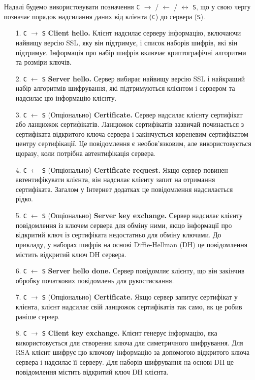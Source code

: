 Надалі будемо використовувати позначення \texttt{C} $\longrightarrow$ / $\longleftarrow$ / $\longleftrightarrow$ \texttt{S}, що у свою чергу позначає порядок надсилання даних від клієнта (\texttt{C}) до сервера (\texttt{S}).
\begin{enumerate}
    \item[1. \texttt{С} $\longrightarrow$ \texttt{S}] \textbf{Client hello.} Клієнт надсилає серверу інформацію, включаючи найвищу версію SSL, яку він підтримує, і список наборів шифрів, які він підтримує. Інформація про набір шифрів включає криптографічні алгоритми та розміри ключів.
    \item[2. \texttt{С} $\longleftarrow$ \texttt{S}] \textbf{Server hello.} Сервер вибирає найвищу версію SSL і найкращий набір алгоритмів шифрування, які підтримуються клієнтом і сервером та надсилає цю інформацію клієнту.
    \item[3. \texttt{С} $\longleftarrow$ \texttt{S}] (Опціонально) \textbf{Certificate.} Сервер надсилає клієнту сертифікат або ланцюжок сертифікатів. Ланцюжок сертифікатів зазвичай починається з сертифіката відкритого ключа сервера і закінчується кореневим сертифікатом центру сертифікації. Це повідомлення є необов'язковим, але використовується щоразу, коли потрібна автентифікація сервера.
    \item[4. \texttt{С} $\longleftarrow$ \texttt{S}] (Опціонально) \textbf{Certificate request.} Якщо сервер повинен автентифікувати клієнта, він надсилає клієнту запит на отримання сертифіката. Загалом у Інтернет додатках це повідомлення надсилається рідко.
    \item[5. \texttt{С} $\longleftarrow$ \texttt{S}] (Опціонально) \textbf{Server key exchange.} Сервер надсилає клієнту повідомлення із ключем сервера для обміну ними, якщо інформації про відкритий ключ із сертифіката недостатньо для обміну ключами. До прикладу, у наборах шифрів на основі Diffie-Hellman (DH) це повідомлення містить відкритий ключ DH сервера.
    \item[6. \texttt{С} $\longleftarrow$ \texttt{S}] \textbf{Server hello done.} Сервер повідомляє клієнту, що він закінчив обробку початкових повідомлень для рукостискання.
    \item[7. \texttt{С} $\longrightarrow$ \texttt{S}] (Опціонально) \textbf{Certificate.} Якщо сервер запитує сертифікат у клієнта, клієнт надсилає свій ланцюжок сертифікатів так само, як це робив раніше сервер.
    \item[8. \texttt{С} $\longrightarrow$ \texttt{S}] \textbf{Client key exchange.} Клієнт генерує інформацію, яка використовується для створення ключа для симетричного шифрування. Для RSA клієнт шифрує цю ключову інформацію за допомогою відкритого ключа сервера і надсилає її серверу. Для наборів шифрування на основі DH це повідомлення містить відкритий ключ DH клієнта.

\end{enumerate}

